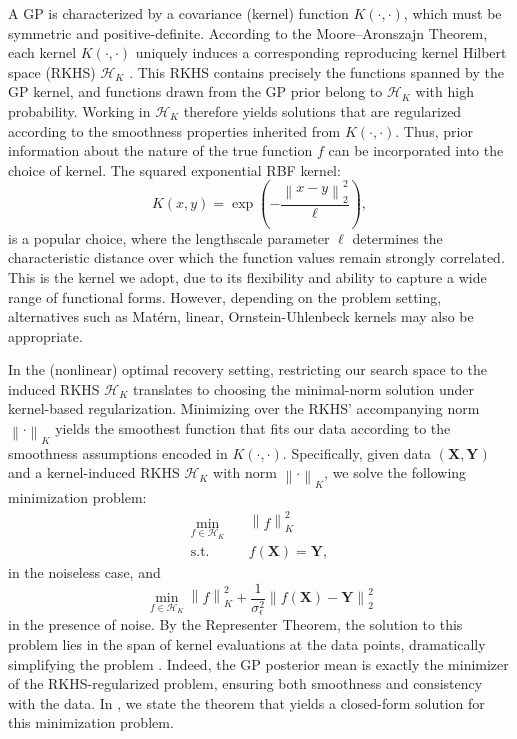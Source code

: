 \documentclass{article}
\theoremstyle{definition}
\theoremstyle{remark}
\newcommand{\norm}[1]{\left \lVert #1 \right \rVert}
\begin{document}
A GP is characterized by a covariance (kernel) function $K(\cdot,\cdot)$, which must be symmetric and positive-definite. According to the Moore–Aronszajn Theorem, each kernel $K(\cdot,\cdot)$ uniquely induces a corresponding reproducing kernel Hilbert space (RKHS) $\mathcal{H}_{K}$ \cite{aronszajn_theory_1950}. This RKHS contains precisely the functions spanned by the GP kernel, and functions drawn from the GP prior belong to $\mathcal{H}_{K}$ with high probability. Working in $\mathcal{H}_{K}$ therefore yields solutions that are regularized according to the smoothness properties inherited from $K(\cdot,\cdot)$. Thus, prior information about the nature of the true function $f$ can be incorporated into the choice of kernel. The squared exponential RBF kernel:
\begin{equation}
K(x,y) = \exp \left( - \frac{ \norm{x-y}_2^2}{\ell} \right),\label{eq:RBF}
\end{equation}
is a popular choice, where the lengthscale parameter $\ell$ determines the characteristic distance over which the function values remain strongly correlated. This is the kernel we adopt, due to its flexibility and ability to capture a wide range of functional forms.  However, depending on the problem setting, alternatives such as Mat\'ern, linear, Ornstein-Uhlenbeck kernels may also be appropriate. 

In the (nonlinear) optimal recovery setting, restricting our search space to the induced RKHS $\mathcal{H}_{K}$ translates to choosing the minimal-norm solution under kernel-based regularization. Minimizing over the RKHS' accompanying norm $\norm{\cdot}_K$ yields the smoothest function that fits our data according to the smoothness assumptions encoded in $K(\cdot,\cdot)$. Specifically, given data $(\mathbf{X},\mathbf{Y})$ and a kernel-induced RKHS $\mathcal{H}_{K}$ with norm $\norm{\cdot}_K$, we solve the following minimization problem:
\begin{equation}\label{eq:GP_recovery_noiseless}
\begin{split}
	\min_{f \in \mathcal{H}_K}  &\norm{f}_K^2\\
\text{s.t.}\qquad  &f(\mathbf{X})=\mathbf{Y},
 \end{split}
\end{equation}
in the noiseless case, and 
\begin{equation} \label{eq:GP_recovery_noisy}
	\min_{f \in \mathcal{H}_K}  \norm{f}_K^2 +\frac{1}{\sigma_{\epsilon}^2} \norm{ f\left( \mathbf{X} \right) - \mathbf{Y} }_2^2
\end{equation}
in the presence of noise. By the Representer Theorem, the solution to this problem lies in the span of kernel evaluations at the data points, dramatically simplifying the problem \cite{scholkopf_generalized_2001}. Indeed, the GP posterior mean is exactly the minimizer of the RKHS-regularized problem, ensuring both smoothness and consistency with the data.
In , we state the theorem that yields a closed-form solution for this minimization problem.
\end{document}
